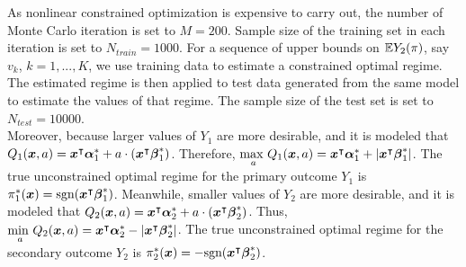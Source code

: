 As nonlinear constrained optimization is expensive to carry out, the number of Monte Carlo iteration is set to $M = 200$. Sample size of the training set in each iteration is set to $N_{train} = 1000$. For a sequence of upper bounds on $\mathbb{E}Y_2(\pi)$, say $v_{k}$, $k = 1, . . . , K$, we use training data to estimate a constrained optimal regime. The estimated regime is then applied to test data generated from the same model to estimate the values of that regime. The sample size of the test set is set to $N_{test} = 10000$. \\

Moreover, because  larger values of $Y_1$ are more desirable, and it is modeled that $Q_{1}(\boldsymbol{x}, a) = \boldsymbol{x}^{\intercal}\boldsymbol{\alpha}^*_1 + a \cdot (\boldsymbol{x}^{\intercal}\boldsymbol{\beta}^*_1)$. Therefore, $\underset{a}{\text{max }} Q_1(\boldsymbol{x}, a) = \boldsymbol{x}^{\intercal}\boldsymbol{\alpha}^*_1 + | \boldsymbol{x}^{\intercal}\boldsymbol{\beta}^*_1 |$. The true unconstrained optimal regime for the primary outcome $Y_1$ is $\pi^{*}_{1}(\boldsymbol{x}) = \text{sgn}(\boldsymbol{x}^{\intercal}\boldsymbol{\beta}^*_1)$.  Meanwhile, smaller values of $Y_2$ are more desirable, and it is modeled that $ Q_2(\boldsymbol{x}, a) = \boldsymbol{x}^{\intercal}\boldsymbol{\alpha}^*_2 + a\cdot(\boldsymbol{x}^{\intercal}\boldsymbol{\beta}^{*}_{2})$. Thus, $\underset{a}{\text{min }} Q_2(\boldsymbol{x}, a) = \boldsymbol{x}^{\intercal}\boldsymbol{\alpha}^{*}_{2} - | \boldsymbol{x}^{\intercal}\boldsymbol{\beta}^{*}_{2} |$. The true unconstrained optimal regime for the secondary outcome $Y_2$ is $\pi^{*}_{2}(\boldsymbol{x}) = -\text{sgn}(\boldsymbol{x}^{\intercal}\boldsymbol{\beta}^{*}_{2})$.\\

